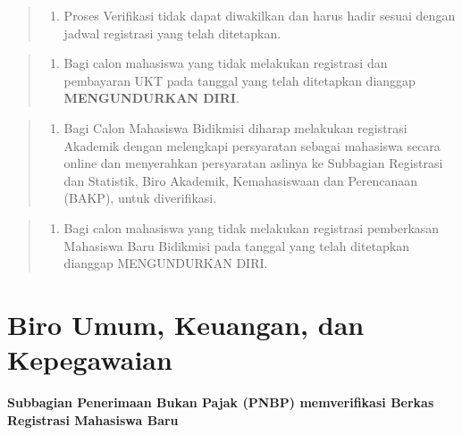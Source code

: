 \documentclass[
]{book}
\providecommand{\tightlist}{%
  \setlength{\itemsep}{0pt}\setlength{\parskip}{0pt}}
\begin{document}
\begin{quote}
\begin{enumerate}
\def\labelenumi{\arabic{enumi}.}
\tightlist
\item
  Proses Verifikasi tidak dapat diwakilkan dan harus hadir sesuai dengan jadwal registrasi yang telah ditetapkan.
\end{enumerate}
\end{quote}

\begin{quote}
\begin{enumerate}
\def\labelenumi{\arabic{enumi}.}
\setcounter{enumi}{1}
\tightlist
\item
  Bagi calon mahasiswa yang tidak melakukan registrasi dan pembayaran UKT pada tanggal yang telah ditetapkan dianggap \textbf{MENGUNDURKAN DIRI}.
\end{enumerate}
\end{quote}

\begin{quote}
\begin{enumerate}
\def\labelenumi{\arabic{enumi}.}
\setcounter{enumi}{2}
\tightlist
\item
  Bagi Calon Mahasiswa Bidikmisi diharap melakukan registrasi Akademik dengan melengkapi persyaratan sebagai mahasiswa secara online dan menyerahkan persyaratan aslinya ke Subbagian Registrasi dan Statistik, Biro Akademik, Kemahasiswaan dan Perencanaan (BAKP), untuk diverifikasi.
\end{enumerate}
\end{quote}

\begin{quote}
\begin{enumerate}
\def\labelenumi{\arabic{enumi}.}
\setcounter{enumi}{3}
\tightlist
\item
  Bagi calon mahasiswa yang tidak melakukan registrasi pemberkasan Mahasiswa Baru Bidikmisi pada tanggal yang telah ditetapkan dianggap MENGUNDURKAN DIRI.
\end{enumerate}
\end{quote}

\hypertarget{biro-umum-keuangan-dan-kepegawaian}{%
\section{Biro Umum, Keuangan, dan Kepegawaian}\label{biro-umum-keuangan-dan-kepegawaian}}

\textbf{Subbagian Penerimaan Bukan Pajak (PNBP) memverifikasi Berkas Registrasi Mahasiswa Baru}
\end{document}
